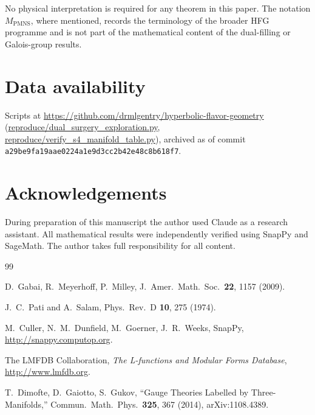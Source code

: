\documentclass[11pt,a4paper]{article}
\theoremstyle{definition}
\theoremstyle{remark}
\begin{document}
No physical interpretation is required for any theorem in this paper.
The notation $M_{\mathrm{PMNS}}$, where mentioned, records the terminology
of the broader HFG programme and is not part of the mathematical content
of the dual-filling or Galois-group results.

\section*{Data availability}
Scripts at
\url{https://github.com/drmlgentry/hyperbolic-flavor-geometry}
(\url{reproduce/dual_surgery_exploration.py},
\url{reproduce/verify_s4_manifold_table.py}), archived as of commit
\texttt{a29be9fa19aae0224a1e9d3cc2b42e48c8b618f7}.

\section*{Acknowledgements}
During preparation of this manuscript the author used Claude as a
research assistant. All mathematical results were independently
verified using SnapPy and SageMath. The author takes full
responsibility for all content.

\begin{thebibliography}{99}

D.~Gabai, R.~Meyerhoff, P.~Milley,
J.\ Amer.\ Math.\ Soc.\ \textbf{22}, 1157 (2009).

J.~C.~Pati and A.~Salam,
Phys.\ Rev.\ D \textbf{10}, 275 (1974).

M.~Culler, N.~M.~Dunfield, M.~Goerner, J.~R.~Weeks,
SnapPy, \url{http://snappy.computop.org}.

The LMFDB Collaboration,
\emph{The L-functions and Modular Forms Database},
\url{http://www.lmfdb.org}.

T.~Dimofte, D.~Gaiotto, S.~Gukov,
``Gauge Theories Labelled by Three-Manifolds,''
Commun.\ Math.\ Phys.\ \textbf{325}, 367 (2014),
arXiv:1108.4389.

\end{thebibliography}
\end{document}
